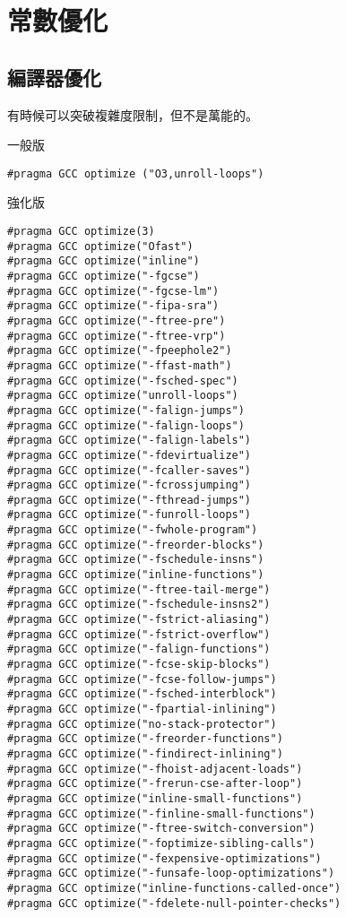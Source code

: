 \section{常數優化}
    \subsection{編譯器優化}
    有時候可以突破複雜度限制，但不是萬能的。

    \example 一般版

\begin{lstlisting}[caption=一般版常數優化]
#pragma GCC optimize ("O3,unroll-loops")\end{lstlisting}

    \example 強化版

\begin{lstlisting}[caption=強化版常數優化]
#pragma GCC optimize(3)
#pragma GCC optimize("Ofast")
#pragma GCC optimize("inline")
#pragma GCC optimize("-fgcse")
#pragma GCC optimize("-fgcse-lm")
#pragma GCC optimize("-fipa-sra")
#pragma GCC optimize("-ftree-pre")
#pragma GCC optimize("-ftree-vrp")
#pragma GCC optimize("-fpeephole2")
#pragma GCC optimize("-ffast-math")
#pragma GCC optimize("-fsched-spec")
#pragma GCC optimize("unroll-loops")
#pragma GCC optimize("-falign-jumps")
#pragma GCC optimize("-falign-loops")
#pragma GCC optimize("-falign-labels")
#pragma GCC optimize("-fdevirtualize")
#pragma GCC optimize("-fcaller-saves")
#pragma GCC optimize("-fcrossjumping")
#pragma GCC optimize("-fthread-jumps")
#pragma GCC optimize("-funroll-loops")
#pragma GCC optimize("-fwhole-program")
#pragma GCC optimize("-freorder-blocks")
#pragma GCC optimize("-fschedule-insns")
#pragma GCC optimize("inline-functions")
#pragma GCC optimize("-ftree-tail-merge")
#pragma GCC optimize("-fschedule-insns2")
#pragma GCC optimize("-fstrict-aliasing")
#pragma GCC optimize("-fstrict-overflow")
#pragma GCC optimize("-falign-functions")
#pragma GCC optimize("-fcse-skip-blocks")
#pragma GCC optimize("-fcse-follow-jumps")
#pragma GCC optimize("-fsched-interblock")
#pragma GCC optimize("-fpartial-inlining")
#pragma GCC optimize("no-stack-protector")
#pragma GCC optimize("-freorder-functions")
#pragma GCC optimize("-findirect-inlining")
#pragma GCC optimize("-fhoist-adjacent-loads")
#pragma GCC optimize("-frerun-cse-after-loop")
#pragma GCC optimize("inline-small-functions")
#pragma GCC optimize("-finline-small-functions")
#pragma GCC optimize("-ftree-switch-conversion")
#pragma GCC optimize("-foptimize-sibling-calls")
#pragma GCC optimize("-fexpensive-optimizations")
#pragma GCC optimize("-funsafe-loop-optimizations")
#pragma GCC optimize("inline-functions-called-once")
#pragma GCC optimize("-fdelete-null-pointer-checks")\end{lstlisting}

